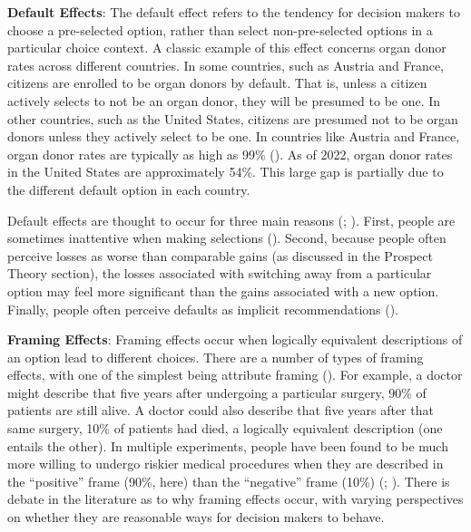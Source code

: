\documentclass[
]{krantz}
\begin{document}
\textbf{Default Effects}: The default effect refers to the tendency for decision makers to choose a pre-selected option, rather than select non-pre-selected options in a particular choice context. A classic example of this effect concerns organ donor rates across different countries. In some countries, such as Austria and France, citizens are enrolled to be organ donors by default. That is, unless a citizen actively selects to not be an organ donor, they will be presumed to be one. In other countries, such as the United States, citizens are presumed not to be organ donors unless they actively select to be one. In countries like Austria and France, organ donor rates are typically as high as 99\% (). As of 2022, organ donor rates in the United States are approximately 54\%. This large gap is partially due to the different default option in each country.

Default effects are thought to occur for three main reasons (; ). First, people are sometimes inattentive when making selections (). Second, because people often perceive losses as worse than comparable gains (as discussed in the Prospect Theory section), the losses associated with switching away from a particular option may feel more significant than the gains associated with a new option. Finally, people often perceive defaults as implicit recommendations ().

\textbf{Framing Effects}: Framing effects occur when logically equivalent descriptions of an option lead to different choices. There are a number of types of framing effects, with one of the simplest being attribute framing (). For example, a doctor might describe that five years after undergoing a particular surgery, 90\% of patients are still alive. A doctor could also describe that five years after that same surgery, 10\% of patients had died, a logically equivalent description (one entails the other). In multiple experiments, people have been found to be much more willing to undergo riskier medical procedures when they are described in the ``positive'' frame (90\%, here) than the ``negative'' frame (10\%) (; ). There is debate in the literature as to why framing effects occur, with varying perspectives on whether they are reasonable ways for decision makers to behave.
\end{document}
